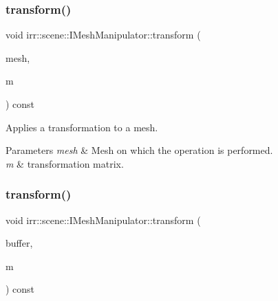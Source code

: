 \subsubsection{\texorpdfstring{transform()}{transform()}\hspace{0.1cm}{\footnotesize\ttfamily [2/4]}}
{\footnotesize\ttfamily void irr\+::scene\+::\+I\+Mesh\+Manipulator\+::transform (\begin{DoxyParamCaption}\item[{\hyperlink{classirr_1_1scene_1_1IMesh}{I\+Mesh} $\ast$}]{mesh,  }\item[{const \hyperlink{namespaceirr_1_1core_a4c9d4e29899535971052810954a14431}{core\+::matrix4} \&}]{m }\end{DoxyParamCaption}) const\hspace{0.3cm}{\ttfamily [inline]}}



Applies a transformation to a mesh. 


\begin{DoxyParams}{Parameters}
{\em mesh} & Mesh on which the operation is performed. \\
\hline
{\em m} & transformation matrix. \\
\hline
\end{DoxyParams}
\mbox{\label{classirr_1_1scene_1_1IMeshManipulator_a14dc2101f7facaddec49f59ed363bbc1}} 
\subsubsection{\texorpdfstring{transform()}{transform()}\hspace{0.1cm}{\footnotesize\ttfamily [3/4]}}
{\footnotesize\ttfamily void irr\+::scene\+::\+I\+Mesh\+Manipulator\+::transform (\begin{DoxyParamCaption}\item[{\hyperlink{classirr_1_1scene_1_1IMeshBuffer}{I\+Mesh\+Buffer} $\ast$}]{buffer,  }\item[{const \hyperlink{namespaceirr_1_1core_a4c9d4e29899535971052810954a14431}{core\+::matrix4} \&}]{m }\end{DoxyParamCaption}) const\hspace{0.3cm}{\ttfamily [inline]}}



